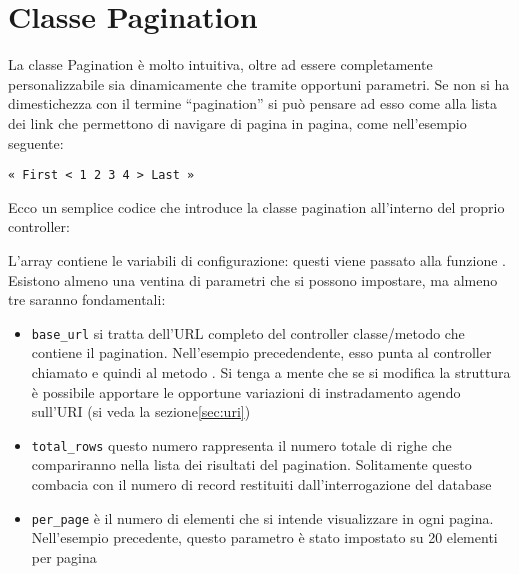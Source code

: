 \section{Classe Pagination}
\label{class:paginatura}

La classe Pagination è molto intuitiva, oltre ad essere completamente personalizzabile sia dinamicamente che tramite opportuni parametri. Se non si ha dimestichezza con il termine ``pagination'' si può pensare ad esso come alla lista dei link che permettono di navigare di pagina in pagina, come nell'esempio seguente:

\verb|« First < 1 2 3 4 > Last »|

Ecco un semplice codice che introduce la classe pagination all'interno del proprio controller:


L'array  contiene le variabili di configurazione: questi viene passato alla funzione . Esistono almeno una ventina di parametri che si possono impostare, ma almeno tre saranno fondamentali:

\begin{itemize}
\item \verb|base_url| si tratta dell'URL completo del controller classe/metodo che contiene il pagination. Nell'esempio precedendente, esso punta al controller chiamato  e quindi al metodo . Si tenga a mente che se si modifica la struttura è possibile apportare le opportune variazioni di instradamento agendo sull'URI (si veda la sezione\vref{sec:uri})
\item \verb|total_rows| questo numero rappresenta il numero totale di righe che compariranno nella lista dei risultati del pagination. Solitamente questo combacia con il numero di record restituiti dall'interrogazione del database
\item \verb|per_page| è il numero di elementi che si intende visualizzare in ogni pagina. Nell'esempio precedente, questo parametro è stato impostato su 20 elementi per pagina
\end{itemize}

